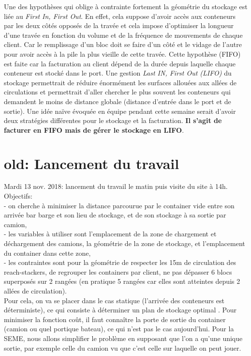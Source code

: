 \documentclass{article}
\begin{document}
Une des hypothèses qui oblige à contrainte fortement la géométrie du stockage est liée au \textit{First In, First Out}. En effet, cela suppose d'avoir accès aux conteneurs par les deux côtés opposés de la travée et cela impose d'optimiser la longueur d'une travée en fonction du volume et de la fréquence de mouvements de chaque client. Car le remplissage d'un bloc doit se faire d'un côté et le vidage de l'autre pour avoir accès à la pile la plus vieille de cette travée. Cette hypothèse (FIFO) est faite car la facturation au client dépend de la durée depuis laquelle chaque conteneur est stocké dans le port. Une gestion \textit{Last IN, First Out (LIFO)} du stockage permettrait de réduire énormément les surfaces allouées aux allées de circulations et permettrait d'aller chercher le plus souvent les conteneurs qui demandent le moins de distance globale (distance d'entrée dans le port et de sortie). Une idée naïve évoquée en équipe pendant cette semaine serait d'avoir deux stratégies différentes pour le stockage et la facturation. \textbf{Il s'agit de facturer en FIFO mais de gérer le stockage en LIFO}. 



\section{old: Lancement du travail}

Mardi 13 nov. 2018: lancement du travail le matin puis visite du site à 14h. \\

Objectifs: \\
- on cherche à minimiser la distance parcourue par le container vide entre son arrivée bar barge et son lieu de stockage, et de son stockage à sa sortie par camion, \\
- les variables à utiliser sont l'emplacement de la zone de chargement et déchargement des camions, la géométrie de la zone de stockage, et l'emplacement du container dans cette zone, \\
- les contraintes sont pour la géométrie de respecter les 15m de circulation des reach-stackers, de regrouper les containers par client, ne pas dépasser 6 blocs superposés sur 2 rangées (en pratique 5 rangées car elles sont atteintes depuis 2 allées de circulation). \\

Pour cela, on va se placer dans le cas statique (l'arrivée des conteneurs est déterministe), ce qui consiste à déterminer un plan de stockage optimal .
Pour minimiser la fonction coût, il faut connaître la porte de sortie du container (camion ou quel portique bateau), ce qui n'est pas le cas aujourd'hui.
Pour la SEME, nous allons simplifier le problème en supposant que l'on a qu'une unique sortie, par exemple celle du camion vu que c'est celle sur laquelle on peut jouer. 
\end{document}
